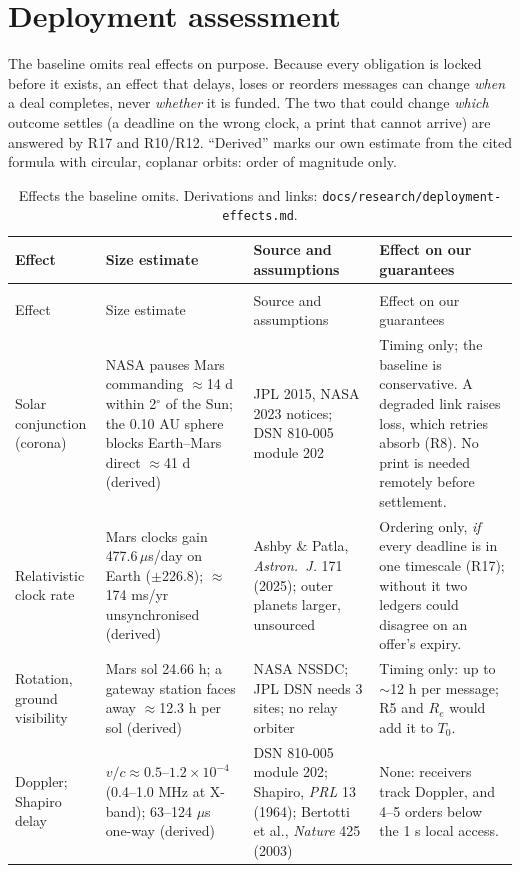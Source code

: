 \section{Deployment assessment}\label{sec:deploy}

The baseline omits real effects on purpose. Because every obligation is locked before it exists, an effect that
delays, loses or reorders messages can change \emph{when} a deal completes, never \emph{whether} it is funded. The two that could
change \emph{which} outcome settles (a deadline on the wrong clock, a print that cannot arrive) are answered by R17 and R10/R12.
``Derived'' marks our own estimate from the cited formula with circular, coplanar orbits: order of magnitude only.

{\setlength{\tabcolsep}{3pt}
\begin{xltabular}{\linewidth}{>{\raggedright\arraybackslash}p{2.1cm}>{\raggedright\arraybackslash}p{3.6cm}>{\raggedright\arraybackslash}X>{\raggedright\arraybackslash}p{4.0cm}}
\caption{Effects the baseline omits. Derivations and links: \texttt{docs/research/deployment-effects.md}.}\label{tab:deploy}\\
\toprule
Effect & Size estimate & Source and assumptions & Effect on our guarantees\\
\midrule
\endfirsthead
{}\\
\toprule
Effect & Size estimate & Source and assumptions & Effect on our guarantees\\
\midrule
\endhead
\bottomrule
\endlastfoot
Solar conjunction (corona) & NASA pauses Mars commanding $\approx$14 d within 2$^\circ$ of the Sun; the 0.10 AU sphere blocks
Earth--Mars direct $\approx$41 d (derived) & JPL 2015, NASA 2023 notices; DSN 810-005 module 202 & Timing only; the baseline is conservative.
A degraded link raises loss, which retries absorb (R8). No print is needed remotely before settlement.\\
Relativistic clock rate & Mars clocks gain 477.6\,$\mu$s/day on Earth ($\pm$226.8); $\approx$174 ms/yr unsynchronised (derived) &
Ashby \& Patla, \emph{Astron.\ J.} 171 (2025); outer planets larger, unsourced & Ordering only, \emph{if} every deadline is in one
timescale (R17); without it two ledgers could disagree on an offer's expiry.\\
Rotation, ground visibility & Mars sol 24.66 h; a gateway station faces away $\approx$12.3 h per sol (derived) & NASA NSSDC; JPL DSN
needs 3 sites; no relay orbiter & Timing only: up to $\sim$12 h per message; R5 and $R_e$ would add it to $T_0$.\\
Doppler; Shapiro delay & $v/c \approx 0.5$--$1.2\times10^{-4}$ (0.4--1.0 MHz at X-band); 63--124 $\mu$s one-way (derived) & DSN 810-005
module 202; Shapiro, \emph{PRL} 13 (1964); Bertotti et al., \emph{Nature} 425 (2003) & None: receivers track Doppler, and 4--5 orders
below the 1 s local access.\\
\end{xltabular}}

